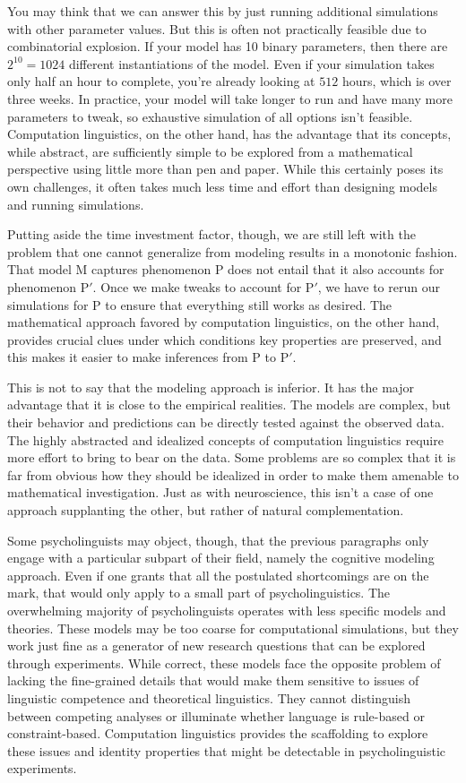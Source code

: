You may think that we can answer this by just running additional simulations with other parameter values.
But this is often not practically feasible due to combinatorial explosion.
If your model has 10 binary parameters, then there are $2^10 = 1024$ different instantiations of the model.
Even if your simulation takes only half an hour to complete, you're already looking at $512$ hours, which is over three weeks.
In practice, your model will take longer to run and have many more parameters to tweak, so exhaustive simulation of all options isn't feasible.
Computation linguistics, on the other hand, has the advantage that its concepts, while abstract, are sufficiently simple to be explored from a mathematical perspective using little more than pen and paper.
While this certainly poses its own challenges, it often takes much less time and effort than designing models and running simulations.

Putting aside the time investment factor, though, we are still left with the problem that one cannot generalize from modeling results in a monotonic fashion.
That model M captures phenomenon P does not entail that it also accounts for phenomenon P$'$.
Once we make tweaks to account for P$'$, we have to rerun our simulations for P to ensure that everything still works as desired.
The mathematical approach favored by computation linguistics, on the other hand, provides crucial clues under which conditions key properties are preserved, and this makes it easier to make inferences from P to P$'$.

This is not to say that the modeling approach is inferior.
It has the major advantage that it is close to the empirical realities.
The models are complex, but their behavior and predictions can be directly tested against the observed data.
The highly abstracted and idealized concepts of computation linguistics require more effort to bring to bear on the data.
Some problems are so complex that it is far from obvious how they should be idealized in order to make them amenable to mathematical investigation.
Just as with neuroscience, this isn't a case of one approach supplanting the other, but rather of natural complementation.

Some psycholinguists may object, though, that the previous paragraphs only engage with a particular subpart of their field, namely the cognitive modeling approach.
Even if one grants that all the postulated shortcomings are on the mark, that would only apply to a small part of psycholinguistics.
The overwhelming majority of psycholinguists operates with less specific models and theories.
These models may be too coarse for computational simulations, but they work just fine as a generator of new research questions that can be explored through experiments.
While correct, these models face the opposite problem of lacking the fine-grained details that would make them sensitive to issues of linguistic competence and theoretical linguistics.
They cannot distinguish between competing analyses or illuminate whether language is rule-based or constraint-based.
Computation linguistics provides the scaffolding to explore these issues and identity properties that might be detectable in psycholinguistic experiments.

